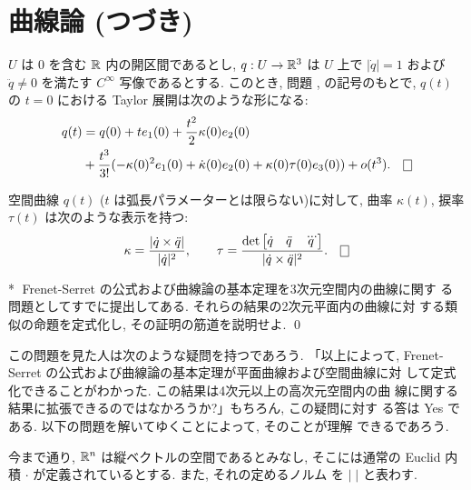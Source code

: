 \documentclass[12pt,twoside]{jarticle}
\def\qstar#1{$\!\!\!$#1$\;$}
\begin{document}

\section{曲線論 (つづき)}

\begin{question}
  $U$ は $0$ を含む ${\mathbb R}$ 内の開区間であるとし, $q : U \to {\mathbb R}^3$ は %
  $U$ 上で $|\dot{q}| = 1$ および $\ddot{q}\ne 0$ を満たす $C^\infty$ %
  写像であるとする. このとき,
  問題 ,  の記号のもとで, $q(t)$ の $t = 0$ %
  における Taylor 展開は次のような形になる:
  \begin{align*}
    q(t)
    & = q(0) + t e_1(0) + \frac{t^2}{2} \kappa(0)e_2(0)
    \\
    & + \frac{t^3}{3!}
    (-\kappa(0)^2 e_1(0) + \dot{\kappa}(0) e_2(0) + \kappa(0)\tau(0)e_3(0))
    + o(t^3).
    \qed
  \end{align*}
\end{question}

\begin{question}
  空間曲線 $q(t)$ ($t$ は弧長パラメーターとは限らない)に対して, 
  曲率 $\kappa(t)$, 捩率 $\tau(t)$ は次のような表示を持つ:
  \[
    \kappa 
    = 
    \frac{|\dot{q} \times \ddot{q}|}
         {|\dot{q}|^2},
    \qquad
    \tau 
    = 
    \frac{\det\begin{bmatrix}\dot{q}&\ddot{q}&\dddot{q}\end{bmatrix}}
         {|\dot{q} \times \ddot{q}|^2}.
  \qed
  \]
\end{question}

\begin{question}\qstar{*}
  Frenet-Serret の公式および曲線論の基本定理を3次元空間内の曲線に関す
  る問題としてすでに提出してある. それらの結果の2次元平面内の曲線に対
  する類似の命題を定式化し, その証明の筋道を説明せよ. \qed
\end{question}

この問題を見た人は次のような疑問を持つであろう. 「以上によって,
Frenet-Serret の公式および曲線論の基本定理が平面曲線および空間曲線に対
して定式化できることがわかった. この結果は4次元以上の高次元空間内の曲
線に関する結果に拡張できるのではなかろうか?」もちろん, この疑問に対す
る答は Yes である. 以下の問題を解いてゆくことによって, そのことが理解
できるであろう.

今まで通り, ${\mathbb R}^n$ は縦ベクトルの空間であるとみなし, そこには通常の 
Euclid 内積 $\cdot$ が定義されているとする. また, それの定めるノルム
を $|\;|$ と表わす.
\end{document}
